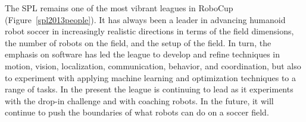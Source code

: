\documentclass{llncs}
\begin{document}
The SPL remains one of the most vibrant leagues in RoboCup (Figure~\ref{spl2013people}). It has always been a leader in
advancing humanoid robot soccer in increasingly realistic directions in terms of the field dimensions, the
number of robots on the field, and the setup of the field. In turn, the emphasis on software has
led the league to develop
and refine techniques in motion, vision, localization, communication, behavior, and coordination, but also to experiment with applying machine learning and optimization techniques to a range of tasks. In the present the league is
continuing to lead as it experiments with the drop-in challenge and with coaching robots. In the future,
it will continue to push the boundaries of what robots can do on a soccer field.


 
\end{document}
